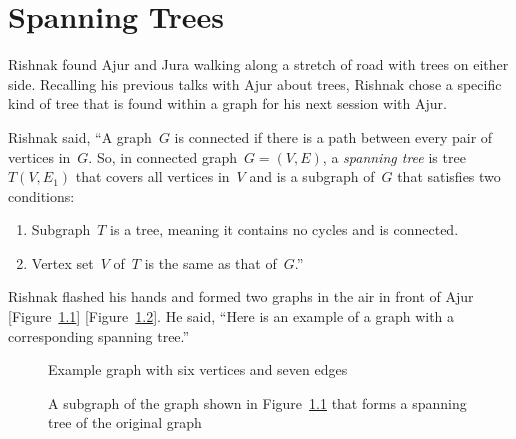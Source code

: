 \chapter{Spanning Trees}
Rishnak found Ajur and Jura walking along a stretch of road with trees on either side. Recalling his previous talks with Ajur about trees, Rishnak chose a specific kind of tree that is found within a graph for his next session with Ajur.

Rishnak said, ``A graph~$G$ is connected if there is a path between every pair of vertices in~$G$. So, in connected graph~$G=(V,E)$, a \textit{spanning tree}  is tree~$T(V,E_1)$ that covers all vertices in~$V$ and is a subgraph of~$G$ that satisfies two conditions:
\begin{enumerate}
    \item Subgraph~$T$ is a tree, meaning it contains no cycles and is connected.
    \item Vertex set~$V$ of~$T$ is the same as that of~$G$.''
\end{enumerate}

Rishnak flashed his hands and formed two graphs in the air in front of Ajur [Figure~\ref{11g1}] [Figure~\ref{11g2}]. He said, ``Here is an example of a graph with a corresponding spanning tree.''

\begin{figure}
\begin{center}
\caption{Example graph with six vertices and seven edges}\label{11g1}
\end{center}
\end{figure}

\begin{figure}
\begin{center}
\caption{A subgraph of the graph shown in Figure~\ref{11g1} that forms a spanning tree of the original graph}\label{11g2}
\end{center}
\end{figure}

